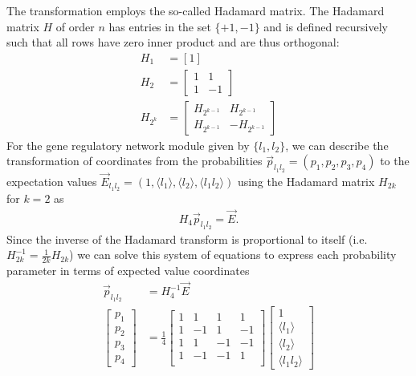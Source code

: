 The transformation employs the so-called Hadamard matrix. The Hadamard matrix $H$ of order $n$ has entries in the set $\{+1,-1\}$ and is defined recursively such that all rows have zero inner product and are thus orthogonal:
\begin{equation}
\begin{aligned}\label{eq:hadamard}
H_1 &= [1]\\
H_2 &= \begin{bmatrix}
1 & 1\\
1 & -1
\end{bmatrix}\\
H_{2^k} &= \begin{bmatrix}
H_{2^{k-1}} & H_{2^{k-1}}\\
H_{2^{k-1}} & -H_{2^{k-1}}
\end{bmatrix}
\end{aligned}
\end{equation}
For the gene regulatory network module given by $\{l_1,l_2\}$, we can describe the transformation of coordinates from the probabilities $\vec{p}_{l_1 l_2} = (p_1, p_2, p_3, p_4)$ to the expectation values $\vec{E}_{l_1 l_2} = (1, \langle l_1 \rangle, \langle l_2 \rangle, \langle l_1 l_2 \rangle)$ using the Hadamard matrix $H_{2k}$ for $k=2$ as
\begin{equation}
\begin{aligned}\label{eq:expecttrans}
H_4 \vec{p}_{l_1 l_2} = \vec{E}.
\end{aligned}
\end{equation}
Since the inverse of the Hadamard transform is proportional to itself (i.e. $H_{2k}^{-1} = \frac{1}{2k}H_{2k}$) we can solve this system of equations to express each probability parameter in terms of expected value coordinates
\begin{equation}
\begin{aligned}\label{eq:expecttransfull}
\vec{p}_{l_1 l_2} &= H_4^{-1}\vec{E}\\
\begin{bmatrix}
p_1\\
p_2\\
p_3\\
p_4
\end{bmatrix} &= \frac{1}{4}\begin{bmatrix}
  1 & 1 & 1 & 1\\
  1 & -1 & 1 & -1\\
  1 & 1 & -1 & -1\\
  1 & -1 & -1 & 1\\
\end{bmatrix} \begin{bmatrix}
1\\
\langle l_1 \rangle\\
\langle l_2 \rangle\\
\langle l_1 l_2 \rangle
\end{bmatrix}
\end{aligned}
\end{equation}
